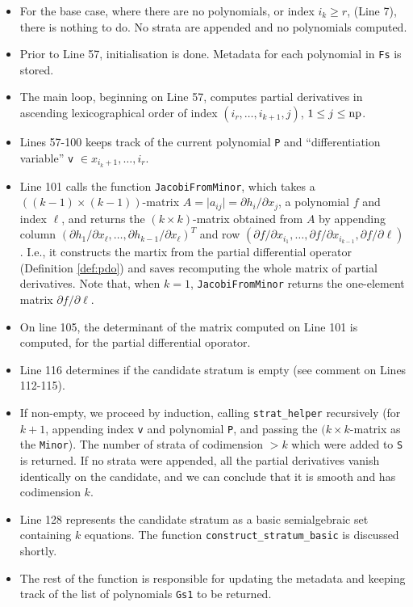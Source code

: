 \documentclass[
]{book}
\providecommand{\tightlist}{%
  \setlength{\itemsep}{0pt}\setlength{\parskip}{0pt}}
\theoremstyle{definition}
\theoremstyle{definition}
\theoremstyle{definition}
\theoremstyle{definition}
\theoremstyle{remark}
\begin{document}
\begin{itemize}
\tightlist
\item
  For the base case, where there are no polynomials, or index \(i_k \ge r\), (Line 7), there is nothing to do. No strata are appended and no polynomials computed.
\item
  Prior to Line 57, initialisation is done. Metadata for each polynomial in \texttt{Fs} is stored.
\item
  The main loop, beginning on Line 57, computes partial derivatives in ascending lexicographical order of index \((i_r,\ldots,i_{k+1},j)\), \(1 \le j \le \rm{np}\).
\item
  Lines 57-100 keeps track of the current polynomial \texttt{P} and ``differentiation variable'' \texttt{v} \(\in x_{i_k+1},\ldots,i_r\).
\item
  Line 101 calls the function \texttt{JacobiFromMinor}, which takes a \(((k-1)\times (k-1))\)-matrix \(A = \vert a_{ij} \vert = \partial h_i / \partial x_j\), a polynomial \(f\) and index \(\ell\), and returns the \((k \times k)\)-matrix obtained from \(A\) by appending column \((\partial h_1 / \partial x_\ell, \ldots, \partial h_{k-1} / \partial x_\ell)^T\) and row \((\partial f / \partial x_{i_1}, \ldots, \partial f / \partial x_{i_{k-1}}, \partial f / \partial \ell)\). I.e., it constructs the martix from the partial differential operator (Definition \ref{def:pdo}) and saves recomputing the whole matrix of partial derivatives. Note that, when \(k=1\), \texttt{JacobiFromMinor} returns the one-element matrix \(\partial f / \partial \ell\).
\item
  On line 105, the determinant of the matrix computed on Line 101 is computed, for the partial differential oporator.
\item
  Line 116 determines if the candidate stratum is empty (see comment on Lines 112-115).
\item
  If non-empty, we proceed by induction, calling \texttt{strat\_helper} recursively (for \(k+1\), appending index \texttt{v} and polynomial \texttt{P}, and passing the \((k \times k\)-matrix as the \texttt{Minor}). The number of strata of codimension \(> k\) which were added to \texttt{S} is returned. If no strata were appended, all the partial derivatives vanish identically on the candidate, and we can conclude that it is smooth and has codimension \(k\).
\item
  Line 128 represents the candidate stratum as a basic semialgebraic set containing \(k\) equations. The function \texttt{construct\_stratum\_basic} is discussed shortly.
\item
  The rest of the function is responsible for updating the metadata and keeping track of the list of polynomials \texttt{Gs1} to be returned.
\end{itemize}
\end{document}
